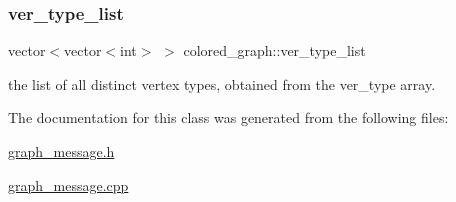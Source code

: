 \mbox{\label{classcolored__graph_a3a1ae8abac458d20a2afb4aa48bbc956}} 
\subsubsection{\texorpdfstring{ver\+\_\+type\+\_\+list}{ver\_type\_list}}
{\footnotesize\ttfamily vector$<$vector$<$int$>$ $>$ colored\+\_\+graph\+::ver\+\_\+type\+\_\+list}



the list of all distinct vertex types, obtained from the ver\+\_\+type array. 



The documentation for this class was generated from the following files\+:\begin{DoxyCompactItemize}
\item 
\hyperlink{graph__message_8h}{graph\+\_\+message.\+h}\item 
\hyperlink{graph__message_8cpp}{graph\+\_\+message.\+cpp}\end{DoxyCompactItemize}
